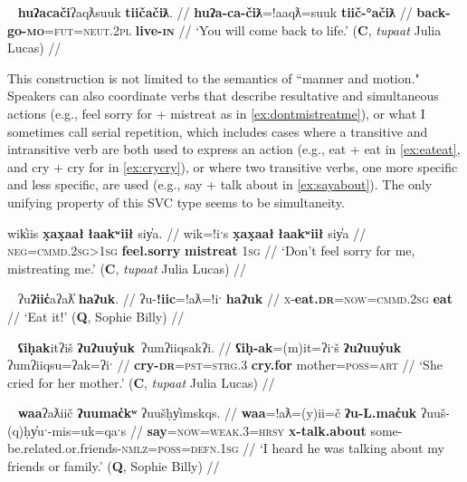 \ex~ \label{ex:comebacktolife}
\begingl
\glpreamble \textbf{huʔacači}ʔaqƛsuuk \textbf{tiičačiƛ}. //
\gla \textbf{huʔa-ca-čiƛ}=!aaqƛ=suuk \textbf{tiič-°ačiƛ} //
\glb \textbf{back-go-\textsc{mo}}=\textsc{fut}=\textsc{neut.2pl} \textbf{live-\textsc{in}} //
\glft `You will come back to life.' (\textbf{C}, \textit{tupaat} Julia Lucas) //
\endgl
\xe

This construction is not limited to the semantics of ``manner and motion." Speakers can also coordinate verbs that describe resultative and simultaneous actions (e.g., feel sorry for + mistreat as in \ref{ex:dontmistreatme}), or what I sometimes call serial repetition, which includes cases where a transitive and intransitive verb are both used to express an action (e.g., eat + eat in \ref{ex:eateat}, and cry + cry for in \ref{ex:crycry}), or where two transitive verbs, one more specific and less specific, are used (e.g., say + talk about in \ref{ex:sayabout}). The only unifying property of this SVC type seems to be simultaneity.

\ex \label{ex:dontmistreatme}
\begingl
\glpreamble wik̓iis \textbf{x̣ax̣aał} \textbf{łaakʷiił} siy̓a. //
\gla wik=!iˑs \textbf{x̣ax̣aał} \textbf{łaakʷiił} siy̓a //
\glb \textsc{neg}=\textsc{cmmd.2sg>1sg} \textbf{feel.sorry} \textbf{mistreat} \textsc{1sg} //
\glft `Don't feel sorry for me, mistreating me.' (\textbf{C}, \textit{tupaat} Julia Lucas) //
\endgl
\xe

\ex~ \label{ex:eateat}
\begingl
\glpreamble ʔu\textbf{ʔiic̓}aʔaƛ̓ \textbf{haʔuk}. //
\gla ʔu-\textbf{!iic}=!aƛ=!iˑ \textbf{haʔuk} //
\glb \textsc{x}-\textbf{eat.\textsc{dr}}=\textsc{now}=\textsc{cmmd.2sg} \textbf{eat} //
\glft `Eat it!' (\textbf{Q}, Sophie Billy) //
\endgl
\xe

\ex~ \label{ex:crycry}
\begingl
\glpreamble \textbf{ʕiḥak}itʔiš \textbf{ʔuʔuuy̓uk}\footnotemark\ ʔumʔiiqsakʔi. //
\gla \textbf{ʕiḥ-ak}=(m)it=ʔiˑš \textbf{ʔuʔuuy̓uk} ʔumʔiiqsu=ʔak=ʔiˑ //
\glb \textbf{cry-\textsc{dr}}=\textsc{pst}=\textsc{strg.3} \textbf{cry.for} mother=\textsc{poss}=\textsc{art} //
\glft `She cried for her mother.' (\textbf{C}, \textit{tupaat} Julia Lucas) //
\endgl
\xe


\ex~ \label{ex:sayabout}
\begingl
\glpreamble \textbf{waa}ʔaƛiič \textbf{ʔuumac̓kʷ} ʔuušḥy̓imskqs. //
\gla \textbf{waa}=!aƛ=(y)ii=č \textbf{ʔu-L.mac̓uk} ʔuuš-(q)ḥy̓uˑ-mis=uk=qaˑs //
\glb \textbf{say}=\textsc{now}=\textsc{weak.3}=\textsc{hrsy} \textbf{\textsc{x}-talk.about} some-be.related.or.friends-\textsc{nmlz}=\textsc{poss}=\textsc{defn.1sg} //
\glft `I heard he was talking about my friends or family.' (\textbf{Q}, Sophie Billy) //
\endgl
\xe

